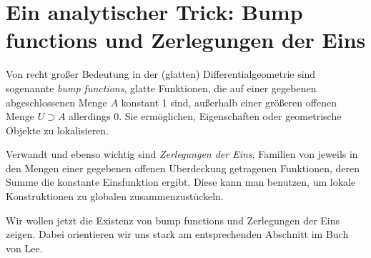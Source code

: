 \documentclass[a4paper]{scrreprt}
\numberwithin{equation}{chapter}
\theoremstyle{definition}
\begin{document}
\chapter{Ein analytischer Trick: Bump functions und Zerlegungen der Eins}

Von recht großer Bedeutung in der (glatten) Differentialgeometrie sind sogenannte \emph{bump functions}, glatte Funktionen, die auf einer gegebenen abgeschlossenen Menge $A$ konstant 1 sind, außerhalb einer größeren offenen Menge $U \supset A$ allerdings 0. Sie ermöglichen, Eigenschaften oder geometrische Objekte zu \glqq lokalisieren\grqq.

Verwandt und ebenso wichtig sind \emph{Zerlegungen der Eins}, Familien von jeweils in den Mengen einer gegebenen offenen Überdeckung getragenen Funktionen, deren Summe die konstante Einsfunktion ergibt. Diese kann man benutzen, um lokale Konstruktionen zu globalen \glqq zusammenzustückeln\grqq.

Wir wollen jetzt die Existenz von bump functions und Zerlegungen der Eins zeigen. Dabei orientieren wir uns stark am entsprechenden Abschnitt im Buch von Lee.

\end{document}
